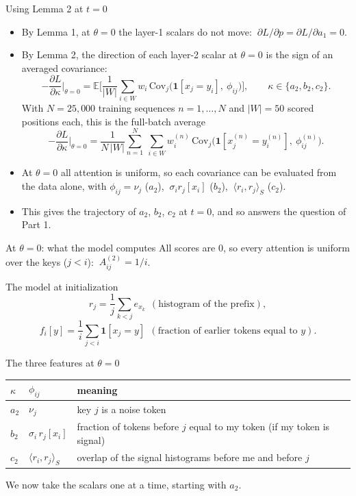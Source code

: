 \documentclass[aspectratio=169,11pt]{beamer}
\newcommand{\1}{\mathbf{1}}
\begin{document}
\begin{frame}{Using Lemma 2 at $t=0$}
\small
\vfill
\begin{itemize}
\item By Lemma 1, at $\theta=0$ the layer-1 scalars do not move: $\ \partial L/\partial p=\partial L/\partial a_1=0$.
\item By Lemma 2, the direction of each layer-2 scalar at $\theta=0$ is the sign of an averaged covariance:
\[
-\frac{\partial L}{\partial\kappa}\Big|_{\theta=0}=\mathbb E\Big[\frac1{|W|}\sum_{i\in W}w_i\,\mathrm{Cov}_{j}\big(\1[x_j=y_i],\ \phi_{ij}\big)\Big],
\qquad\kappa\in\{a_2,b_2,c_2\}.
\]
With $N=25{,}000$ training sequences $n=1,\dots,N$ and $|W|=50$ scored positions each, this is the full-batch average
\[
-\frac{\partial L}{\partial\kappa}\Big|_{\theta=0}=\frac{1}{N\,|W|}\sum_{n=1}^{N}\ \sum_{i\in W}w^{(n)}_i\,\mathrm{Cov}_j\big(\1[x^{(n)}_j=y^{(n)}_i],\ \phi^{(n)}_{ij}\big).
\]
\item At $\theta=0$ all attention is uniform, so each covariance can be evaluated from the data alone, with
$\phi_{ij}=\nu_j$ ($a_2$), $\ \sigma_ir_j[x_i]$ ($b_2$), $\ \langle r_i,r_j\rangle_S$ ($c_2$).
\item This gives the trajectory of $a_2$, $b_2$, $c_2$ at $t=0$, and so answers the question of Part 1.
\end{itemize}
\vfill
\end{frame}

\begin{frame}{At $\theta=0$: what the model computes}
\small
All scores are $0$, so every attention is uniform over the keys ($j<i$): $\ A^{(2)}_{ij}=1/i$.
\begin{block}{The model at initialization}
\vspace{-0.5em}
\[
r_j=\frac1j\sum_{k<j}e_{x_k}\ \ (\text{histogram of the prefix}),
\]
\[
f_i[y]=\frac1i\sum_{j<i}\1[x_j=y]\ \ (\text{fraction of earlier tokens equal to }y).
\]
\end{block}
\begin{block}{The three features at $\theta=0$}
\begin{center}
\begin{tabular}{lll}\toprule
$\kappa$ & $\phi_{ij}$ & meaning\\\midrule
$a_2$ & $\nu_j$ & key $j$ is a noise token\\
$b_2$ & $\sigma_i\,r_j[x_i]$ & fraction of tokens before $j$ equal to my token (if my token is signal)\\
$c_2$ & $\langle r_i,r_j\rangle_S$ & overlap of the signal histograms before me and before $j$\\\bottomrule
\end{tabular}
\end{center}
\end{block}
We now take the scalars one at a time, starting with $a_2$.
\end{frame}
\end{document}
